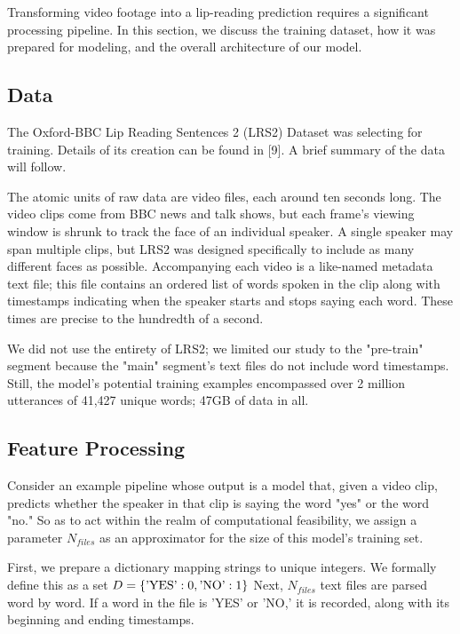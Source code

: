 \documentclass{article}
\begin{document}
Transforming video footage into a lip-reading prediction requires a significant processing pipeline. In this section, we discuss the training dataset, how it was prepared for modeling, and the overall architecture of our model.

\subsection{Data}

The Oxford-BBC Lip Reading Sentences 2 (LRS2) Dataset was selecting for training. Details of its creation can be found in [9]. A brief summary of the data will follow.

The atomic units of raw data are video files, each around ten seconds long. The video clips come from BBC news and talk shows, but each frame's viewing window is shrunk to track the face of an individual speaker. A single speaker may span multiple clips, but LRS2 was designed specifically to include as many different faces as possible. Accompanying each video is a like-named metadata text file; this file contains an ordered list of words spoken in the clip along with timestamps indicating when the speaker starts and stops saying each word. These times are precise to the hundredth of a second.

We did not use the entirety of LRS2; we limited our study to the "pre-train" segment because the "main" segment's text files do not include word timestamps. Still, the model's potential training examples encompassed over 2 million utterances of 41,427 unique words; 47GB of data in all.

\subsection{Feature Processing}

Consider an example pipeline whose output is a model that, given a video clip, predicts whether the speaker in that clip is saying the word "yes" or the word "no." So as to act within the realm of computational feasibility, we assign a parameter $N_{files}$ as an approximator for the size of this model's training set.

First, we prepare a dictionary mapping strings to unique integers. We formally define this as a set $D = \{\hbox{'YES'}: 0, \hbox{'NO'} : 1\}$ Next, $N_{files}$ text files are parsed word by word. If a word in the file is 'YES' or 'NO,' it is recorded, along with its beginning and ending timestamps.
\end{document}
